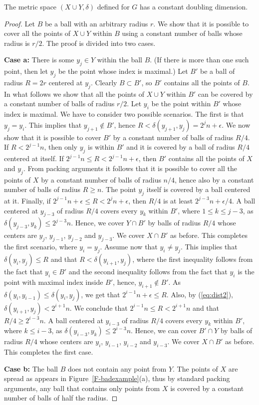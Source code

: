 \documentclass[proceedings]{stacs}
\theoremstyle{plain}\newtheorem{satz}[thm]{Satz}
\theoremstyle{definition}\newtheorem{crucial}[thm]{Crucial Definition}
\newcommand{\eps}{\epsilon}
\begin{document}
\begin{theorem}
The metric space $(X\cup Y,\delta)$ defined for $G$ has a constant
doubling dimension.
\end{theorem}
\begin{proof}
Let $B$ be a ball with an arbitrary radius $r$. We show that it is
possible to cover all the points of $X\cup Y$ within $B$ using a
constant number of balls whose radius is $r/2$. The proof is
divided into two cases.

{\bf Case a:} There is some $y_j \in Y$ within the ball $B$. (If
there is more than one such point, then let $y_j$ be the point
whose index is maximal.) Let $B'$ be a ball of radius $R=2r$
centered at $y_j$. Clearly $B\subset B'$, so $B'$ contains all the
points of $B$. In what follows we show that all the points of
$X\cup Y$ within $B'$ can be covered by a constant number of balls
of radius $r/2$. Let $y_i$ be the point within $B'$ whose index is
maximal.  We have to consider two possible scenarios. The first is
that $y_j=y_i$. This implies that $y_{j+1} \notin B'$, hence $R <
\delta(y_{j+1},y_j)=2^{j}n + \eps$. We now show that it is
possible to cover $B'$ by a constant number of balls of radius
$R/4$. If $R<2^{j-1}n$, then only $y_j$ is within $B'$ and it is
covered by a ball of radius $R/4$ centered at itself. If $2^{j-1}n
\leq R<2^{j-1}n+\eps$, then $B'$ contains all the points of $X$
and $y_j$. From packing arguments it follows that it is possible
to cover all the points of $X$ by a constant number of balls of
radius $n/4$, hence also by a constant number of balls of radius
$R\geq n$. The point $y_j$ itself is covered by a ball centered at
it. Finally, if $2^{j-1}n+\eps \leq R<2^{j}n+\eps$, then $R/4$ is
at least $2^{j-3}n+\eps/4$.
A ball centered at $y_{j-3}$ of radius $R/4$ covers every $y_k$
within $B'$, where $1\le k\leq j-3$, as $\delta(y_{j-3},y_k) \leq
2^{j-3}n$. Hence, we cover $Y\cap B'$ by balls of radius $R/4$
whose centers are $y_j$, $y_{j-1}$, $y_{j-2}$ and $y_{j-3}$. We
cover $X\cap B'$ as before. This completes the first scenario,
where $y_i = y_j$. Assume now that $y_i\neq y_j$. This implies
that $\delta(y_i,y_j)\leq R$ and that $R < \delta(y_{i+1},y_{j})$,
where the first inequality follows from the fact that $y_i\in B'$
and the second inequality follows from the fact that $y_i$ is the
point with maximal index inside $B'$, hence, $y_{i+1}\notin B'$.
As $\delta(y_{i},y_{i-1})\leq\delta(y_i,y_j)$, we get that
$2^{i-1}n+\eps \leq R$. Also, by (\ref{eq:dist2}),
$\delta(y_{i+1},y_{j})<2^{i+1}n$. We conclude that $2^{i-1}n \leq
R < 2^{i+1}n$ and that $R/4 \geq  2^{i-3}n$. A ball centered at
$y_{i-3}$ of radius $R/4$ covers every $y_k$ within $B'$, where
$k\leq i-3$, as $\delta(y_{i-3},y_k) \leq 2^{i-3}n$. Hence, we can
cover $B'\cap Y$ by balls of radius $R/4$ whose centers are $y_i$,
$y_{i-1}$, $y_{i-2}$ and $y_{i-3}$. We cover $X\cap B'$ as before.
This completes the first case.

{\bf Case b:} The ball $B$ does not contain any point from $Y$.
The points of $X$ are spread as appears in
Figure~\ref{F-badexample}(a), thus by standard packing arguments,
any ball that contains only points from $X$ is covered by a
constant number of balls of half the radius.
\end{proof}
\end{document}
